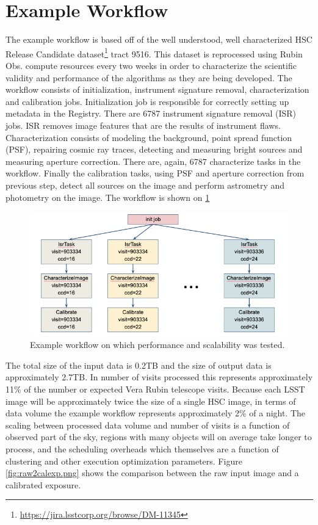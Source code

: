 \documentclass[a4paper, 10pt, conference]{ieeeconf}
\begin{document}
\section{Example Workflow}

The example workflow is based off of the well understood, well characterized HSC Release Candidate dataset\footnote{\url{https://jira.lsstcorp.org/browse/DM-11345}} tract 9516. This dataset is reprocessed using Rubin Obs. compute resources every two weeks in order to characterize the scientific validity and performance of the algorithms as they are being developed. The workflow consists of initialization, instrument signature removal, characterization and calibration jobs. Initialization job is responsible for correctly setting up metadata in the Registry. There are 6787 instrument signature removal (ISR) jobs. ISR removes image features that are the results of instrument flaws. Characterization consists of modeling the background, point spread function (PSF), repairing cosmic ray traces, detecting and measuring bright sources and measuring aperture correction. There are, again, 6787 characterize tasks in the workflow. Finally the calibration tasks, using PSF and aperture correction from previous step, detect all sources on the image and perform astrometry and photometry on the image. The workflow is shown on \ref{fig:demo-workflow}

\begin{figure}[htb]
\centering
\includegraphics[width=\columnwidth]{figures/demo-workflow.png}
\caption{Example workflow on which performance and scalability was tested.}
\label{fig:demo-workflow}
\end{figure}

The total size of the input data is 0.2TB and the size of output data is approximately 2.7TB. In number of visits processed this represents approximately 11\% of the number or expected Vera Rubin telescope visits. Because each LSST image will be approximately twice the size of a single HSC image, in terms of data volume the example workflow represents approximately 2\% of a night. The scaling between processed data volume and number of visits is a function of observed part of the sky, regions with many objects will on average take longer to process, and the scheduling overheads which themselves are a function of clustering and other execution optimization parameters. Figure \ref{fig:raw2calexp.png} shows the comparison between the raw input image and a calibrated exposure.
\end{document}
